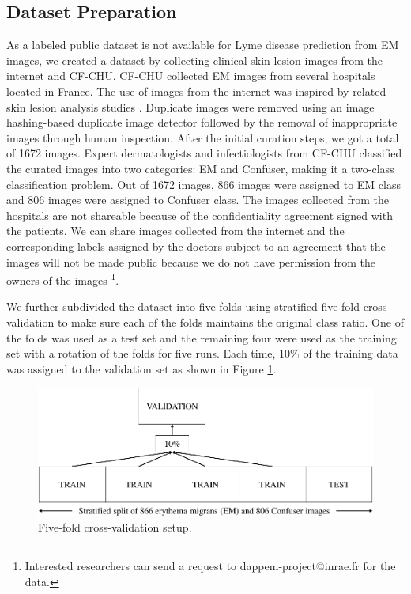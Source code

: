 \subsection{Dataset Preparation}\label{sec:dataset_prep}

As a labeled public dataset is not available for Lyme disease prediction from EM images, we created a dataset by collecting clinical skin lesion images from the internet and CF-CHU. CF-CHU collected EM images from several hospitals located in France. The use of images from the internet was inspired by related skin lesion analysis studies \cite{Burlina2018, Burlina2020, Esteva2017}. Duplicate images were removed using an image hashing-based duplicate image detector followed by the removal of inappropriate images through human inspection. After the initial curation steps, we got a total of 1672 images. Expert dermatologists and infectiologists from CF-CHU classified the curated images into two categories: EM and Confuser, making it a two-class classification problem. Out of 1672 images, 866 images were assigned to EM class and 806 images were assigned to Confuser class. The images collected from the hospitals are not shareable because of the confidentiality agreement signed with the patients. We can share images collected from the internet and the corresponding labels assigned by the doctors subject to an agreement that the images will not be made public because we do not have permission from the owners of the images \footnote{Interested researchers can send a request to dappem-project@inrae.fr for the data.}.

We further subdivided the dataset into five folds using stratified five-fold cross-validation to make sure each of the folds maintains the original class ratio. One of the folds was used as a test set and the remaining four were used as the training set with a rotation of the folds for five runs. Each time, 10\% of the training data was assigned to the validation set as shown in Figure \ref{fig:cross-validation}.
\begin{figure}[htb!]
	\centering
	\includegraphics[width=\textwidth,keepaspectratio]{images/pretraining/cross-validation-cropped.pdf}
	\caption[Five-fold cross-validation setup]{Five-fold cross-validation setup.}
	\label{fig:cross-validation}
\end{figure}

